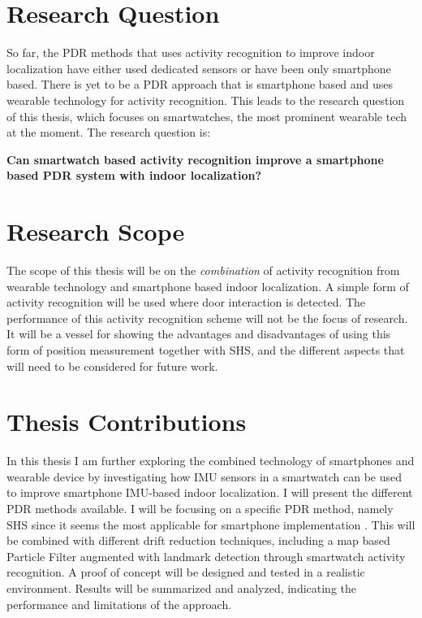 \section{Research Question}

So far, the PDR methods that uses activity recognition to improve indoor localization have either used dedicated sensors or have been only smartphone based. There is yet to be a \ac{PDR} approach that is smartphone based and uses wearable technology for activity recognition. This leads to the research question of this thesis, which focuses on smartwatches, the most prominent wearable tech at the moment. The research question is:

\textbf{Can smartwatch based activity recognition improve a smartphone based \ac{PDR} system with indoor localization?}

\section{Research Scope}

The scope of this thesis will be on the \textit{combination} of activity recognition from wearable technology and smartphone based indoor localization. A simple form of activity recognition will be used where door interaction is detected. The performance of this activity recognition scheme will not be the focus of research. It will be a vessel for showing the advantages and disadvantages of using this form of position measurement together with \ac{SHS}, and the different aspects that will need to be considered for future work.

\section{Thesis Contributions}

In this thesis I am further exploring the combined technology of smartphones and wearable device by investigating how \ac{IMU} sensors in a smartwatch can be used to improve smartphone IMU-based indoor localization. I will present the different \ac{PDR} methods available. I will be focusing on a specific \ac{PDR} method, namely \ac{SHS} since it seems the most applicable for smartphone implementation \cite{Kang2015}. This will be combined with different drift reduction techniques, including a map based Particle Filter augmented with landmark detection through smartwatch activity recognition. A proof of concept will be designed and tested in a realistic environment. Results will be summarized and analyzed, indicating the performance and limitations of the approach.

